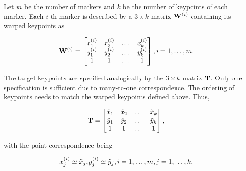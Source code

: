 Let $m$ be the number of markers and $k$ be the number of keypoints of each marker. Each $i$-th marker is described by a $3 \times k$ matrix ${\mathbf{W}}^{\left( {i} \right)}$ containing its warped keypoints as

\begin{equation}
    {\mathbf{W}}^{\left( {i} \right)} =
    \begin{bmatrix}
        {x}_{1}^{\left( {i} \right)} & {x}_{2}^{\left( {i} \right)} & \dots & {x}_{k}^{\left( {i} \right)} \\
        {y}_{1}^{\left( {i} \right)} & {y}_{2}^{\left( {i} \right)} & \dots & {y}_{k}^{\left( {i} \right)} \\
        1                         & 1                         & \dots & 1
    \end{bmatrix},
    i = 1, \dots, m.
\end{equation}

\noindent The target keypoints are specified analogically by the $3 \times k$ matrix $\mathbf{T}$. Only one specification is sufficient due to many-to-one correspondence. The ordering of keypoints needs to match the warped keypoints defined above. Thus,

\begin{equation}
    \mathbf{T} =
    \begin{bmatrix}
        \tilde{x}_1 & \tilde{x}_2 & \dots & \tilde{x}_k \\
        \tilde{y}_1 & \tilde{y}_2 & \dots & \tilde{y}_k \\
        1           & 1           & \dots & 1
    \end{bmatrix},
\end{equation}

\noindent with the point correspondence being

\begin{equation}
    {x}_{j}^{\left( {i} \right)} \simeq \tilde{x}_j, {y}_{j}^{\left( {i} \right)} \simeq \tilde{y}_j, i = 1, \dots, m, j = 1, \dots, k.
\end{equation}

